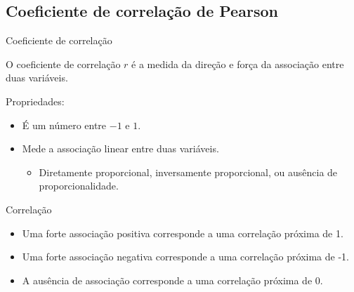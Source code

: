 \documentclass{beamer}
\begin{document}
\subsection[Pearson]{Coeficiente de correlação de Pearson}

\begin{frame}{Coeficiente de correlação}
  \begin{definition}
    O coeficiente de correlação $r$ é a medida da direção e força da
    associação entre duas variáveis.
  \end{definition}
  Propriedades:
  \begin{itemize}
  \item É um número entre $-1$ e $1$.
  \item Mede a associação \alert{linear} entre duas variáveis.
    \begin{itemize}
    \item Diretamente proporcional, inversamente proporcional, ou
      ausência de proporcionalidade.
    \end{itemize}
  \end{itemize}
\end{frame}


\begin{frame}{Correlação}
  \begin{block}{}
    \begin{itemize}
    \item Uma forte associação \alert<2>{positiva} corresponde a uma correlação
      próxima de \alert<2>{1}.
    \item Uma forte associação \alert<3>{negativa} corresponde a uma correlação
      próxima de \alert<3>{-1}.
    \item A \alert<4>{ausência} de associação corresponde a uma
      correlação próxima de \alert<4>{0}.
    \end{itemize}
  \end{block}
\end{frame}
\end{document}
